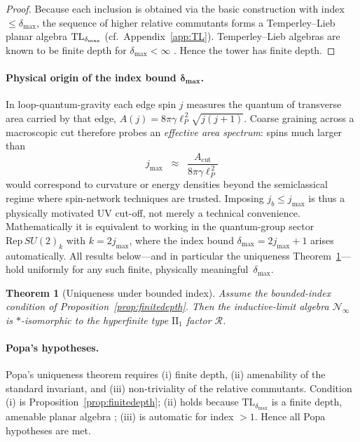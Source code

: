 \documentclass[11pt]{article}
\newtheorem{theorem}{Theorem}[section]
\begin{document}
\begin{proof}
Because each inclusion is obtained via the basic construction with
index $\le\delta_{\max}$, the sequence of higher relative commutants
forms a Temperley--Lieb planar algebra ${\rm TL}_{\delta_{\max}}$
(cf.\ Appendix~\ref{app:TL}).  
Temperley--Lieb algebras are known to be finite depth for 
$\delta_{\max}\!<\!\infty$ \cite[Prop.~2.2]{JonesTL}.  Hence the tower
has finite depth.
\end{proof}

\paragraph{Physical origin of the index bound $\boldsymbol{\delta_{\max}}$.}
In loop-quantum-gravity each edge spin \(j\) measures the quantum of
transverse area carried by that edge, 
\(A(j)=8\pi\gamma \ell_{\!P}^{\,2}\sqrt{j(j+1)}\).
Coarse graining across a macroscopic cut therefore probes an \emph{effective
area spectrum}: spins much larger than
\[
  j_{\mathrm{max}}
  \;\;\approx\;\;
  \frac{A_{\mathrm{cut}}}{8\pi\gamma\ell_{\!P}^{\,2}}
\]
would correspond to curvature or energy densities beyond the
semiclassical regime where spin-network techniques are trusted.
Imposing \(j_b\le j_{\mathrm{max}}\) is thus a physically motivated UV
cut-off, not merely a technical convenience.  Mathematically it is
equivalent to working in the quantum-group sector
\(\mathrm{Rep}\,SU(2)_k\) with
\(k=2 j_{\mathrm{max}}\), where the index bound
\(\delta_{\max}=2j_{\mathrm{max}}+1\) arises automatically.  All results
below—and in particular the uniqueness
Theorem~\ref{thm:unique}—hold uniformly for any such finite, physically
meaningful~\(\delta_{\max}\).


\begin{theorem}[Uniqueness under bounded index]\label{thm:unique}
Assume the bounded-index condition of Proposition~\ref{prop:finitedepth}.
Then the inductive-limit algebra $\mathcal N_{\infty}$ is
$*$-isomorphic to the hyperfinite type $\mathrm{II}_1$ factor
$\mathcal R$.
\end{theorem}

\paragraph{Popa's hypotheses.}
Popa’s uniqueness theorem requires (i) finite depth,
(ii) amenability of the standard invariant, and
(iii) non-triviality of the relative commutants.
Condition (i) is Proposition~\ref{prop:finitedepth};
(ii) holds because $\mathrm{TL}_{\delta_{\max}}$ is a
finite depth, amenable planar algebra \cite{JonesPA};
(iii) is automatic for index $>1$.  Hence all Popa hypotheses are met.
\end{document}
